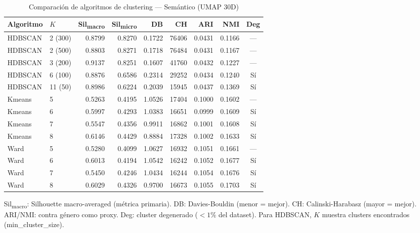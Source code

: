 \begin{table}[htbp]
  \centering
  \small
  \caption{Comparación de algoritmos de clustering --- Semántico (UMAP 30D)}
  \label{tab:clustering_comparison_semantic_umap}
  \begin{tabular}{llrrrrrrc}
    \toprule
    Algoritmo & $K$ & Sil\textsubscript{macro} & Sil\textsubscript{micro} & DB & CH & ARI & NMI & Deg \\
    \midrule
    HDBSCAN & 2 (300) & 0.8799 & 0.8270 & 0.1722 & 76406 & 0.0431 & 0.1166 & --- \\
    HDBSCAN & 2 (500) & 0.8803 & 0.8271 & 0.1718 & 76484 & 0.0431 & 0.1167 & --- \\
    HDBSCAN & 3 (200) & 0.9137 & 0.8251 & 0.1607 & 41760 & 0.0432 & 0.1227 & --- \\
    HDBSCAN & 6 (100) & 0.8876 & 0.6586 & 0.2314 & 29252 & 0.0434 & 0.1240 & Sí \\
    HDBSCAN & 11 (50) & 0.8986 & 0.6224 & 0.2039 & 15945 & 0.0437 & 0.1369 & Sí \\
    Kmeans & 5 & 0.5263 & 0.4195 & 1.0526 & 17404 & 0.1000 & 0.1602 & --- \\
    Kmeans & 6 & 0.5997 & 0.4293 & 1.0383 & 16651 & 0.0999 & 0.1609 & Sí \\
    Kmeans & 7 & 0.5547 & 0.4356 & 0.9911 & 16862 & 0.1001 & 0.1608 & Sí \\
    Kmeans & 8 & 0.6146 & 0.4429 & 0.8884 & 17328 & 0.1002 & 0.1633 & Sí \\
    Ward & 5 & 0.5280 & 0.4099 & 1.0627 & 16932 & 0.1051 & 0.1661 & --- \\
    Ward & 6 & 0.6013 & 0.4194 & 1.0542 & 16242 & 0.1052 & 0.1677 & Sí \\
    Ward & 7 & 0.5450 & 0.4246 & 1.0434 & 16244 & 0.1054 & 0.1676 & Sí \\
    Ward & 8 & 0.6029 & 0.4326 & 0.9700 & 16673 & 0.1055 & 0.1703 & Sí \\
    \bottomrule
  \end{tabular}
  \begin{tablenotes}[flushleft]
    \small
    \item Sil\textsubscript{macro}: Silhouette macro-averaged (métrica primaria). DB: Davies-Bouldin (menor = mejor). CH: Calinski-Harabasz (mayor = mejor). ARI/NMI: contra género como proxy. Deg: cluster degenerado ($<1\%$ del dataset). Para HDBSCAN, $K$ muestra clusters encontrados (min\_cluster\_size).
  \end{tablenotes}
\end{table}